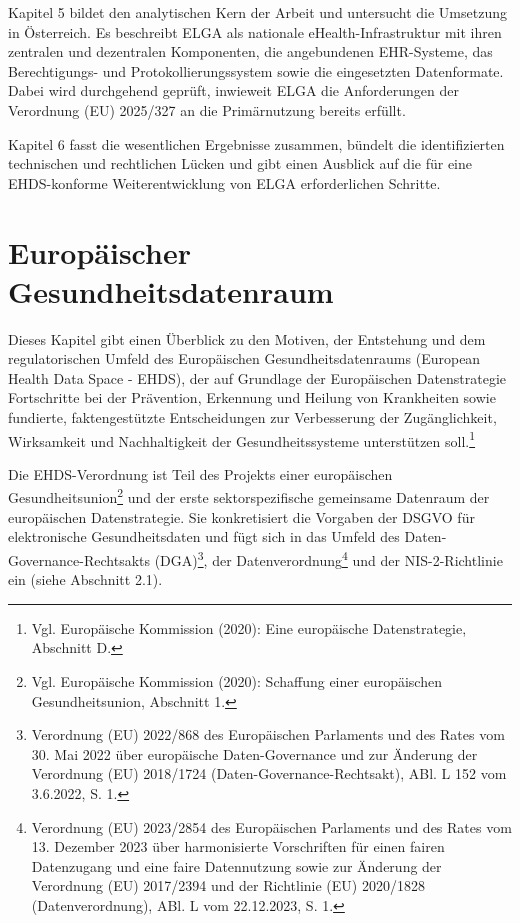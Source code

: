 Kapitel 5 bildet den analytischen Kern der Arbeit und untersucht die Umsetzung in Österreich. Es beschreibt ELGA als nationale eHealth-Infrastruktur mit ihren zentralen und dezentralen Komponenten, die angebundenen EHR-Systeme, das Berechtigungs- und Protokollierungssystem sowie die eingesetzten Datenformate. Dabei wird durchgehend geprüft, inwieweit ELGA die Anforderungen der Verordnung (EU) 2025/327 an die Primärnutzung bereits erfüllt.

Kapitel 6 fasst die wesentlichen Ergebnisse zusammen, bündelt die identifizierten technischen und rechtlichen Lücken und gibt einen Ausblick auf die für eine EHDS-konforme Weiterentwicklung von ELGA erforderlichen Schritte.



\chapter{Europäischer Gesundheitsdatenraum}
Dieses Kapitel gibt einen Überblick zu den Motiven, der Entstehung und dem regulatorischen Umfeld des Europäischen Gesundheitsdatenraums (European Health Data Space - EHDS), der auf Grundlage der Europäischen Datenstrategie Fortschritte bei der Prävention, Erkennung und Heilung von Krankheiten sowie fundierte, faktengestützte Entscheidungen zur Verbesserung der Zugänglichkeit, Wirksamkeit und Nachhaltigkeit der Gesundheitssysteme unterstützen soll.\footnote{Vgl. Europäische Kommission (2020): Eine europäische Datenstrategie, Abschnitt D.}

Die EHDS-Verordnung ist Teil des Projekts einer europäischen Gesundheitsunion\footnote{Vgl. Europäische Kommission (2020): Schaffung einer europäischen Gesundheitsunion, Abschnitt 1.} und der erste sektorspezifische gemeinsame Datenraum der europäischen Datenstrategie. Sie konkretisiert die Vorgaben der DSGVO für elektronische Gesundheitsdaten und fügt sich in das Umfeld des Daten-Governance-Rechtsakts (DGA)\footnote{Verordnung (EU) 2022/868 des Europäischen Parlaments und des Rates vom 30. Mai 2022 über europäische Daten-Governance und zur Änderung der Verordnung (EU) 2018/1724 (Daten-Governance-Rechtsakt), ABl. L 152 vom 3.6.2022, S. 1.}, der Datenverordnung\footnote{Verordnung (EU) 2023/2854 des Europäischen Parlaments und des Rates vom 13. Dezember 2023 über harmonisierte Vorschriften für einen fairen Datenzugang und eine faire Datennutzung sowie zur Änderung der Verordnung (EU) 2017/2394 und der Richtlinie (EU) 2020/1828 (Datenverordnung), ABl. L vom 22.12.2023, S. 1.} und der NIS-2-Richtlinie ein (siehe Abschnitt 2.1).

